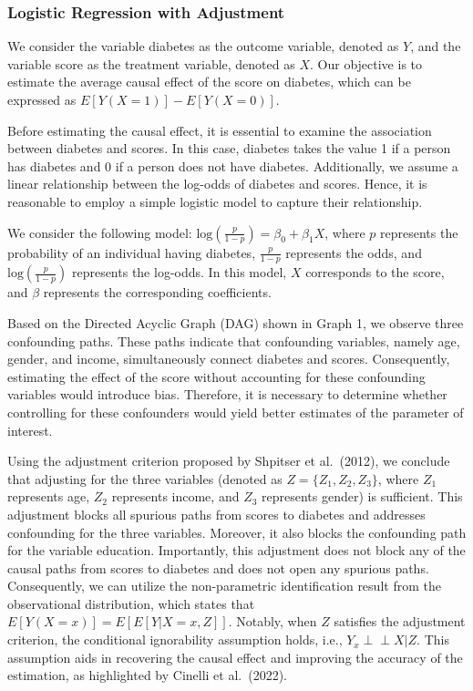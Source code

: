 \documentclass[
  12pt,
]{article}
\begin{document}
\hypertarget{logistic-regression-with-adjustment}{%
\subsubsection{Logistic Regression with
Adjustment}\label{logistic-regression-with-adjustment}}

We consider the variable diabetes as the outcome variable, denoted as
\(Y\), and the variable score as the treatment variable, denoted as
\(X\). Our objective is to estimate the average causal effect of the
score on diabetes, which can be expressed as \(E[Y(X=1)] - E[Y(X=0)]\).

Before estimating the causal effect, it is essential to examine the
association between diabetes and scores. In this case, diabetes takes
the value 1 if a person has diabetes and 0 if a person does not have
diabetes. Additionally, we assume a linear relationship between the
log-odds of diabetes and scores. Hence, it is reasonable to employ a
simple logistic model to capture their relationship.

We consider the following model:
\(\text{log}(\frac{p}{1-p}) = \beta_0 + \beta_1 X\), where \(p\)
represents the probability of an individual having diabetes,
\(\frac{p}{1-p}\) represents the odds, and \(\text{log}(\frac{p}{1-p})\)
represents the log-odds. In this model, \(X\) corresponds to the score,
and \(\beta\) represents the corresponding coefficients.

Based on the Directed Acyclic Graph (DAG) shown in Graph 1, we observe
three confounding paths. These paths indicate that confounding
variables, namely age, gender, and income, simultaneously connect
diabetes and scores. Consequently, estimating the effect of the score
without accounting for these confounding variables would introduce bias.
Therefore, it is necessary to determine whether controlling for these
confounders would yield better estimates of the parameter of interest.

Using the adjustment criterion proposed by Shpitser et al.~(2012), we
conclude that adjusting for the three variables (denoted as
\(Z=\{Z_1, Z_2, Z_3\}\), where \(Z_1\) represents age, \(Z_2\)
represents income, and \(Z_3\) represents gender) is sufficient. This
adjustment blocks all spurious paths from scores to diabetes and
addresses confounding for the three variables. Moreover, it also blocks
the confounding path for the variable education. Importantly, this
adjustment does not block any of the causal paths from scores to
diabetes and does not open any spurious paths. Consequently, we can
utilize the non-parametric identification result from the observational
distribution, which states that \(E[Y(X=x)] = E[E[Y|X=x,Z]]\). Notably,
when \(Z\) satisfies the adjustment criterion, the conditional
ignorability assumption holds, i.e., \(Y_x \perp\!\!\!\perp X |Z\). This
assumption aids in recovering the causal effect and improving the
accuracy of the estimation, as highlighted by Cinelli et al.~(2022).
\end{document}

